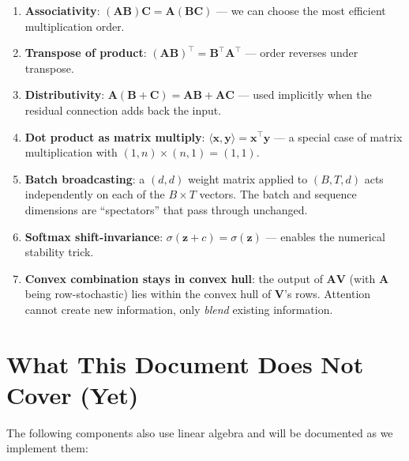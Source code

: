 \documentclass[11pt, a4paper]{article}
\newcommand{\vx}{\bm{x}}
\newcommand{\mV}{\bm{V}}
\newcommand{\mA}{\bm{A}}
\begin{document}
\begin{formaldef}
\begin{enumerate}[nosep]
  \item \textbf{Associativity}: $(\bm{A}\bm{B})\bm{C} = \bm{A}(\bm{B}\bm{C})$
        --- we can choose the most efficient multiplication order.

  \item \textbf{Transpose of product}: $(\bm{A}\bm{B})^\top = \bm{B}^\top \bm{A}^\top$
        --- order reverses under transpose.

  \item \textbf{Distributivity}: $\bm{A}(\bm{B} + \bm{C}) = \bm{A}\bm{B} + \bm{A}\bm{C}$
        --- used implicitly when the residual connection adds back the input.

  \item \textbf{Dot product as matrix multiply}: $\langle \vx, \bm{y} \rangle = \vx^\top \bm{y}$
        --- a special case of matrix multiplication with $(1, n) \times (n, 1) = (1, 1)$.

  \item \textbf{Batch broadcasting}: a $(d, d)$ weight matrix applied to $(B, T, d)$
        acts independently on each of the $B \times T$ vectors. The batch and sequence
        dimensions are ``spectators'' that pass through unchanged.

  \item \textbf{Softmax shift-invariance}: $\sigma(\bm{z} + c) = \sigma(\bm{z})$
        --- enables the numerical stability trick.

  \item \textbf{Convex combination stays in convex hull}: the output of $\mA\mV$
        (with $\mA$ being row-stochastic) lies within the convex hull of $\mV$'s rows.
        Attention cannot create new information, only \textit{blend} existing information.
\end{enumerate}
\end{formaldef}

\section{What This Document Does Not Cover (Yet)}

The following components also use linear algebra and will be documented
as we implement them:
\end{document}
